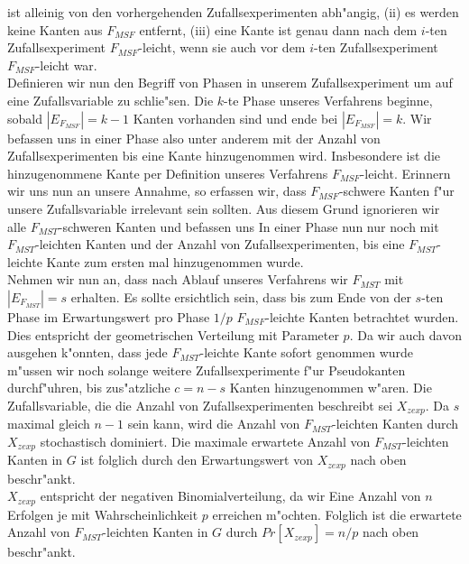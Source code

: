     ist alleinig von den vorhergehenden Zufallsexperimenten abh"angig,
    (ii) es werden keine Kanten aus $F_{MSF}$ entfernt,
    (iii) eine Kante ist genau dann nach dem $i$-ten Zufallsexperiment 
    $F_{MSF}$-leicht, wenn sie auch vor dem $i$-ten Zufallsexperiment $F_{MSF}$-leicht
    war.\\
Definieren wir nun den Begriff von Phasen in unserem Zufallsexperiment um auf
    eine Zufallsvariable zu schlie"sen.
    Die $k$-te Phase unseres Verfahrens beginne, sobald $|E_{F_{MSF}}| = k-1$ Kanten
    vorhanden sind und ende bei $|E_{F_{MSF}}| = k$.
    Wir befassen uns in einer Phase also unter anderem mit der Anzahl von 
    Zufallsexperimenten bis eine Kante hinzugenommen wird.
    Insbesondere ist die hinzugenommene Kante per Definition unseres Verfahrens
    $F_{MSF}$-leicht. Erinnern wir uns nun an unsere Annahme, so erfassen wir,
    dass $F_{MSF}$-schwere Kanten f"ur unsere Zufallsvariable irrelevant sein
    sollten. Aus diesem Grund ignorieren wir alle $F_{MST}$-schweren Kanten und
    befassen uns In einer Phase nun nur noch mit $F_{MST}$-leichten Kanten und
    der Anzahl von Zufallsexperimenten, bis eine $F_{MST}$-leichte Kante zum 
    ersten mal hinzugenommen wurde.\\
Nehmen wir nun an, dass nach Ablauf unseres Verfahrens wir $F_{MST}$ mit
    $|E_{F_{MST}}| = s$ erhalten. Es sollte ersichtlich sein, dass bis zum Ende
    von der $s$-ten Phase im Erwartungswert pro Phase $1/p$ $F_{MSF}$-leichte
    Kanten betrachtet wurden. Dies entspricht der geometrischen Verteilung mit
    Parameter $p$. Da wir auch davon ausgehen k"onnten, dass jede $F_{MST}$-leichte
    Kante sofort genommen wurde m"ussen wir noch solange weitere 
    Zufallsexperimente f"ur Pseudokanten durchf"uhren, bis zus"atzliche 
    $c=n-s$ Kanten hinzugenommen w"aren.
    Die Zufallsvariable, die die Anzahl von Zufallsexperimenten beschreibt sei
    $X_{zexp}$.
    Da $s$ maximal gleich $n-1$ sein kann, wird die Anzahl von $F_{MST}$-leichten
    Kanten durch $X_{zexp}$ stochastisch dominiert.
    Die maximale erwartete Anzahl von $F_{MST}$-leichten Kanten in $G$ ist folglich durch den
    Erwartungswert von $X_{zexp}$ nach oben beschr"ankt.\\
$X_{zexp}$ entspricht der negativen Binomialverteilung, da wir Eine Anzahl von
    $n$ Erfolgen je mit Wahrscheinlichkeit $p$ erreichen m"ochten. 
    Folglich ist die erwartete Anzahl von $F_{MST}$-leichten Kanten in $G$ durch 
    $Pr[X_{zexp}] = n/p$ nach oben beschr"ankt.\\
